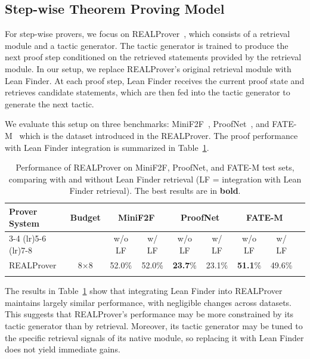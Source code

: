 \documentclass{article} %
\begin{document}
\subsection{Step-wise Theorem Proving Model}
\label{sec:step_proof_gen}

For step-wise provers, we focus on REALProver~\citep{shen2025real}, which consists of a retrieval module and a tactic generator. The tactic generator is trained to produce the next proof step conditioned on the retrieved statements provided by the retrieval module. In our setup, we replace REALProver’s original retrieval module with Lean Finder. At each proof step, Lean Finder receives the current proof state and retrieves candidate statements, which are then fed into the tactic generator to generate the next tactic.  

We evaluate this setup on three benchmarks: MiniF2F~\citep{minif2f}, ProofNet~\citep{proofnet}, and FATE-M~\citep{shen2025real} which is the dataset introduced in the REALProver. The proof performance with Lean Finder integration is summarized in Table~\ref{table:interactive_proof_result}.

\begin{table}[h!]
\captionsetup{font=small}
\caption{Performance of REALProver on MiniF2F, ProofNet, and FATE-M test sets, comparing with and without Lean Finder retrieval (LF = integration with Lean Finder retrieval). The best results are in \textbf{bold}.}
\vspace{-1em}
\centering
\begin{tabular}{lcccccccc}
\toprule
Prover System & Budget & \multicolumn{2}{c}{MiniF2F} & \multicolumn{2}{c}{ProofNet} & \multicolumn{2}{c}{FATE-M} \\
\cmidrule(lr){3-4} \cmidrule(lr){5-6} \cmidrule(lr){7-8}
              &        & w/o LF & w/ LF & w/o LF & w/ LF & w/o LF & w/ LF \\
\midrule
REALProver    & 8$\times$8   & 52.0\% & 52.0\% & \textbf{23.7}\% & 23.1\% & \textbf{51.1}\% & 49.6\% \\
\bottomrule
\label{table:interactive_proof_result}
\end{tabular}
\vspace{-1em}
\end{table}

The results in Table~\ref{table:interactive_proof_result} show that integrating Lean Finder into REALProver maintains largely similar performance, with negligible changes across datasets. This suggests that REALProver’s performance may be more constrained by its tactic generator than by retrieval. Moreover, its tactic generator may be tuned to the specific retrieval signals of its native module, so replacing it with Lean Finder does not yield immediate gains.
\end{document}
